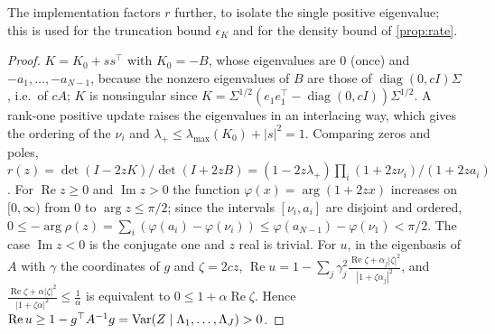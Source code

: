 The implementation factors $r$ further, to isolate the single positive eigenvalue; this is used for the truncation bound
$\epsilon_K$ and for the density bound of \cref{prop:rate}.

\begin{proof}
$K=K_0+ss^\top$ with $K_0=-B$, whose eigenvalues are $0$ (once) and $-a_1,\dots,-a_{N-1}$, because the nonzero eigenvalues
of $B$ are those of $\operatorname{diag}(0,cI)\Sigma$, i.e.\ of $cA$; $K$ is nonsingular since
$K=\Sigma^{1/2}(e_1e_1^\top-\operatorname{diag}(0,cI))\Sigma^{1/2}$. A rank-one positive update raises the eigenvalues in
an interlacing way, which gives the ordering of the $\nu_i$ and $\lambda_+\le\lambda_{\max}(K_0)+|s|^2=1$. Comparing zeros
and poles, $r(z)=\det(I-2zK)/\det(I+2zB)=(1-2z\lambda_+)\prod_i(1+2z\nu_i)/(1+2za_i)$. For $\operatorname{Re}z\ge0$ and
$\operatorname{Im}z>0$ the function $\varphi(x)=\arg(1+2zx)$ increases on $[0,\infty)$ from $0$ to $\arg z\le\pi/2$; since the
intervals $[\nu_i,a_i]$ are disjoint and ordered, $0\le-\arg\rho(z)=\sum_i(\varphi(a_i)-\varphi(\nu_i))\le\varphi(a_{N-1})-\varphi(\nu_1)<\pi/2$.
The case $\operatorname{Im}z<0$ is the conjugate one and $z$ real is trivial. For $u$, in the eigenbasis of $A$ with
$\gamma$ the coordinates of $g$ and $\zeta=2cz$,
$\operatorname{Re}u=1-\sum_j\gamma_j^2\frac{\operatorname{Re}\zeta+\alpha_j|\zeta|^2}{|1+\zeta\alpha_j|^2}$, and
$\frac{\operatorname{Re}\zeta+\alpha|\zeta|^2}{|1+\zeta\alpha|^2}\le\frac1\alpha$ is equivalent to $0\le1+\alpha\operatorname{Re}\zeta$.
Hence $\operatorname{Re}u\ge1-g^\top A^{-1}g=\operatorname{Var}(Z\mid\Lambda_1,\dots,\Lambda_J)>0$.
\end{proof}

